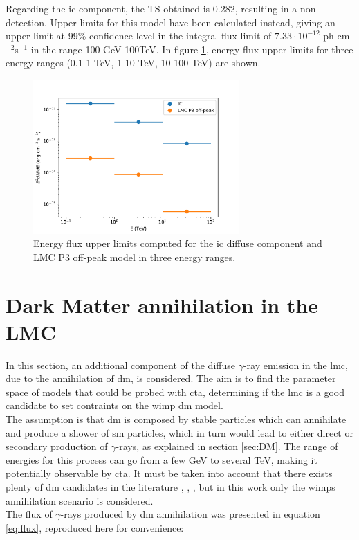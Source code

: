 \documentclass[main.tex]{subfiles}
\begin{document}
Regarding the \gls{ic} component, the TS obtained is 0.282, resulting in a non-detection. Upper limits for this model have been calculated instead, giving an upper limit at 99\% confidence level in the integral flux limit of $7.33\cdot10^{-12}$ ph cm$^{-2}$s$^{-1}$ in the range 100 GeV-100TeV. In figure \ref{fig:sensiulimits}, energy flux upper limits for three energy ranges (0.1-1 TeV, 1-10 TeV, 10-100 TeV) are shown.

\begin{figure}[h!]
  \centering
  \includegraphics[width=0.7\textwidth]{Pictures/sensicurves_ic+lmcp3.pdf}
  \caption{\label{fig:sensiulimits} Energy flux upper limits computed for the \gls{ic} diffuse component and LMC P3 off-peak model in three energy ranges.}
\end{figure}

\section{Dark Matter annihilation in the LMC} \label{sec:dminlmc}

In this section, an additional component of the diffuse $\gamma$-ray emission in the \gls{lmc}, due to the annihilation of \gls{dm}, is considered. The aim is to find the parameter space of models that could be probed with \gls{cta}, determining if the \gls{lmc} is a good candidate to set contraints on the \gls{wimp} \gls{dm} model.\\
The assumption is that \gls{dm} is composed by stable particles which can annihilate and produce a shower of \gls{sm} particles, which in turn would lead to either direct or secondary production of $\gamma$-rays, as explained in section \ref{sec:DM}. The range of energies for this process can go from a few GeV to several TeV, making it potentially observable by \gls{cta}. It must be taken into account that there exists plenty of \gls{dm} candidates in the literature \cite{2004DMcandidates}, \cite{2005DMcandidates}, \cite{2009DMcandidates}, but in this work only the \glspl{wimp} annihilation scenario is considered.\\
The flux of $\gamma$-rays produced by \gls{dm} annihilation was presented in equation \ref{eq:flux}, reproduced here for convenience:
\end{document}
